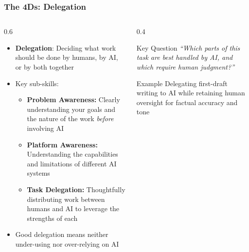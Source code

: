\begin{frame}[fragile]\frametitle{The 4Ds: Delegation}
\begin{columns}
    \begin{column}[T]{0.6\linewidth}
      \begin{itemize}
        \item \textbf{Delegation}: Deciding what work should be done by humans, by AI, or by both together
        \item Key sub-skills:
          \begin{itemize}
            \item \textbf{Problem Awareness:} Clearly understanding your goals and the nature of the work \emph{before} involving AI
            \item \textbf{Platform Awareness:} Understanding the capabilities and limitations of different AI systems
            \item \textbf{Task Delegation:} Thoughtfully distributing work between humans and AI to leverage the strengths of each
          \end{itemize}
        \item Good delegation means neither under-using nor over-relying on AI
      \end{itemize}
    \end{column}
    \begin{column}[T]{0.4\linewidth}
      \begin{alertblock}{Key Question}
        \emph{``Which parts of this task are best handled by AI, and which require human judgment?''}
      \end{alertblock}
      \vspace{0.5em}
      \begin{exampleblock}{Example}
        Delegating first-draft writing to AI while retaining human oversight for factual accuracy and tone
      \end{exampleblock}
    \end{column}
  \end{columns}
\end{frame}


